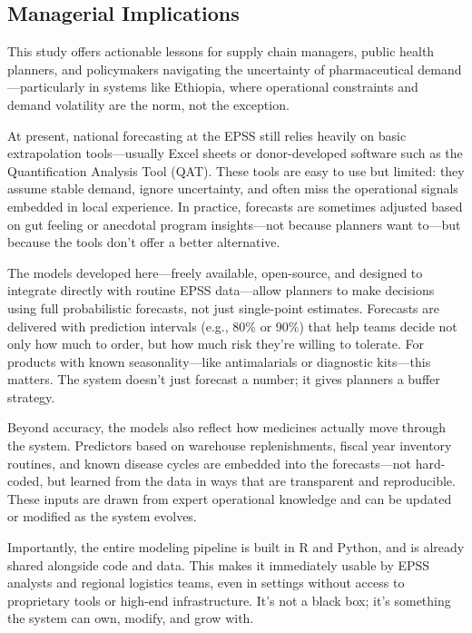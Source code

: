 \documentclass[
  authoryear,
  preprint,
  3p]{elsarticle}
\begin{document}
\subsection{Managerial Implications}\label{managerial-implications}

This study offers actionable lessons for supply chain managers, public
health planners, and policymakers navigating the uncertainty of
pharmaceutical demand---particularly in systems like Ethiopia, where
operational constraints and demand volatility are the norm, not the
exception.

At present, national forecasting at the EPSS still relies heavily on
basic extrapolation tools---usually Excel sheets or donor-developed
software such as the Quantification Analysis Tool (QAT). These tools are
easy to use but limited: they assume stable demand, ignore uncertainty,
and often miss the operational signals embedded in local experience. In
practice, forecasts are sometimes adjusted based on gut feeling or
anecdotal program insights---not because planners want to---but because
the tools don't offer a better alternative.

The models developed here---freely available, open-source, and designed
to integrate directly with routine EPSS data---allow planners to make
decisions using full probabilistic forecasts, not just single-point
estimates. Forecasts are delivered with prediction intervals (e.g., 80\%
or 90\%) that help teams decide not only how much to order, but how much
risk they're willing to tolerate. For products with known
seasonality---like antimalarials or diagnostic kits---this matters. The
system doesn't just forecast a number; it gives planners a buffer
strategy.

Beyond accuracy, the models also reflect how medicines actually move
through the system. Predictors based on warehouse replenishments, fiscal
year inventory routines, and known disease cycles are embedded into the
forecasts---not hard-coded, but learned from the data in ways that are
transparent and reproducible. These inputs are drawn from expert
operational knowledge and can be updated or modified as the system
evolves.

Importantly, the entire modeling pipeline is built in R and Python, and
is already shared alongside code and data. This makes it immediately
usable by EPSS analysts and regional logistics teams, even in settings
without access to proprietary tools or high-end infrastructure. It's not
a black box; it's something the system can own, modify, and grow with.
\end{document}
